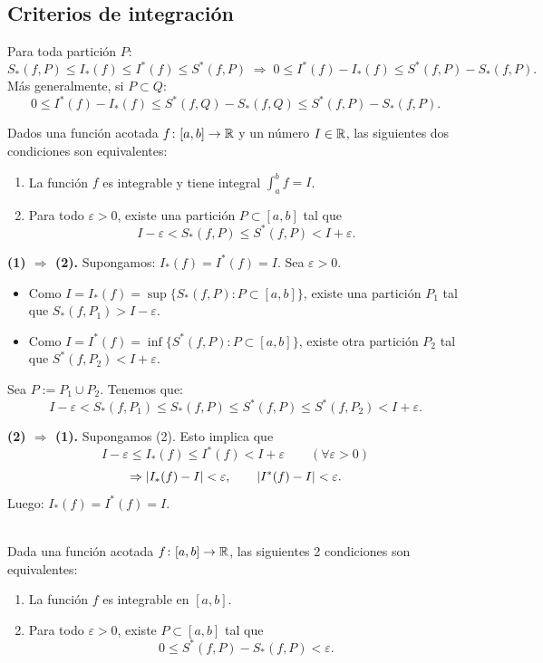 \documentclass[11pt,a4paper]{article}
\begin{document}
\subsection{Criterios de integración}

\begin{observacion}
Para toda partición $P$:
\[
  S_*(f,P)\le I_*(f)\le I^*(f)\le S^*(f,P)
  \;\Rightarrow\; 0\le I^*(f)-I_*(f)\le S^*(f,P)-S_*(f,P).
\]
Más generalmente, si $P\subset Q$:
\[
  0\le I^*(f)-I_*(f)\le S^*(f,Q)-S_*(f,Q)\le S^*(f,P)-S_*(f,P).
\]
\end{observacion}

\begin{proposicion}
Dados una función acotada $f\colon[a,b]\to\mathbb{R}$ y un número $I\in\mathbb{R}$, las siguientes dos condiciones son equivalentes:
\begin{enumerate}
  \item La función $f$ es integrable y tiene integral $\int_a^b f=I$.
  \item Para todo $\varepsilon>0$, existe una partición $P\subset[a,b]$ tal que
  \[
    I-\varepsilon<S_*(f,P)\le S^*(f,P)<I+\varepsilon.
  \]
\end{enumerate}
\end{proposicion}

\begin{demo}
\textbf{(1) $\Rightarrow$ (2).} Supongamos: $I_*(f)=I^*(f)=I$. Sea $\varepsilon>0$.
\begin{itemize}
  \item Como $I=I_*(f)=\sup\{S_*(f,P):P\subset[a,b]\}$, existe una partición $P_1$ tal que $S_*(f,P_1)>I-\varepsilon$.
  \item Como $I=I^*(f)=\inf\{S^*(f,P):P\subset[a,b]\}$, existe otra partición $P_2$ tal que $S^*(f,P_2)<I+\varepsilon$.
\end{itemize}
Sea $P:=P_1\cup P_2$. Tenemos que:
\[
  I-\varepsilon<S_*(f,P_1)\le S_*(f,P)\le S^*(f,P)\le S^*(f,P_2)<I+\varepsilon.
\]

\textbf{(2) $\Rightarrow$ (1).} Supongamos (2). Esto implica que
\[
  I-\varepsilon\le I_*(f)\le I^*(f)<I+\varepsilon \qquad (\forall\varepsilon>0)
\]
\[
  \Rightarrow \lvert I_*(f)-I\rvert<\varepsilon,\qquad \lvert I^*(f)-I\rvert<\varepsilon.
\]
Luego: $I_*(f)=I^*(f)=I$.
\end{demo}

\begin{proposicion}\mbox{}\\
Dada una función acotada $f\colon[a,b]\to\mathbb{R}$, las siguientes 2 condiciones son equivalentes:
\begin{enumerate}
  \item La función $f$ es integrable en $[a,b]$.
  \item Para todo $\varepsilon>0$, existe $P\subset[a,b]$ tal que
  \[
    0\le S^*(f,P)-S_*(f,P)<\varepsilon.
  \]
\end{enumerate}
\end{proposicion}
\end{document}
